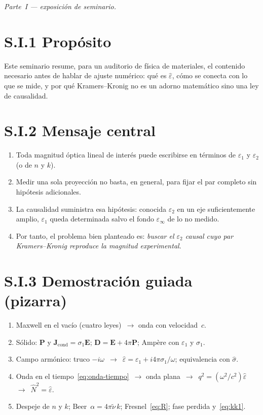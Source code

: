 \noindent\textit{Parte~I --- exposici\'on de seminario.}

\section*{S.I.1 Prop\'osito}

Este seminario resume, para un auditorio de f\'isica de materiales, el contenido necesario antes de hablar de ajuste num\'erico:
qu\'e es $\hat\varepsilon$, c\'omo se conecta con lo que se mide, y por qu\'e Kramers--Kronig no es un adorno matem\'atico sino una ley de causalidad.

\section*{S.I.2 Mensaje central}

\begin{enumerate}[leftmargin=*]
\item Toda magnitud \'optica lineal de inter\'es puede escribirse en t\'erminos de $\varepsilon_1$ y $\varepsilon_2$ (o de $n$ y $k$).
\item Medir una sola proyecci\'on no basta, en general, para fijar el par completo sin hip\'otesis adicionales.
\item La causalidad suministra esa hip\'otesis: conocida $\varepsilon_2$ en un eje suficientemente amplio, $\varepsilon_1$ queda determinada salvo el fondo $\varepsilon_\infty$ de lo no medido.
\item Por tanto, el problema bien planteado es: \emph{buscar el $\varepsilon_2$ causal cuyo par Kramers--Kronig reproduce la magnitud experimental}.
\end{enumerate}

\section*{S.I.3 Demostraci\'on guiada (pizarra)}

\begin{enumerate}[leftmargin=*]
\item Maxwell en el vac\'io (cuatro leyes)~$\to$ onda con velocidad~$c$.
\item S\'olido: $\mathbf{P}$ y $\mathbf{J}_{\mathrm{cond}}=\sigma_1\mathbf{E}$; $\mathbf{D}=\mathbf{E}+4\pi\mathbf{P}$; Amp\`ere con $\varepsilon_1$ y $\sigma_1$.
\item Campo arm\'onico: truco $-i\omega$~$\to$~$\hat\varepsilon=\varepsilon_1+i 4\pi\sigma_1/\omega$; equivalencia con $\hat\sigma$.
\item Onda en el tiempo~\eqref{eq:onda-tiempo}~$\to$ onda plana~$\to$~$q^{2}=(\omega^{2}/c^{2})\hat\varepsilon$~$\to$~$\hat N^{2}=\hat\varepsilon$.
\item Despeje de $n$ y $k$; Beer~$\alpha=4\pi\tilde\nu\,k$; Fresnel~\eqref{eq:R}; fase perdida y~\eqref{eq:kk1}.
\end{enumerate}


